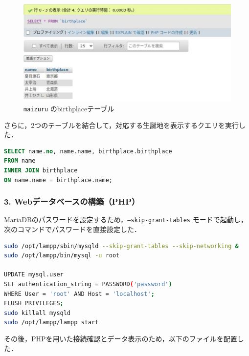 \begin{figure}[htbp]
  \centering
  \includegraphics[width=0.9\linewidth]{figure/4.pdf}
  \caption{\texttt{maizuru} のbirthplaceテーブル}
\end{figure}

さらに，2つのテーブルを結合して，対応する生誕地を表示するクエリを実行した．

\begin{lstlisting}[language=SQL]
SELECT name.no, name.name, birthplace.birthplace 
FROM name 
INNER JOIN birthplace 
ON name.name = birthplace.name;
\end{lstlisting}

\subsubsection*{3. Webデータベースの構築（PHP）}

MariaDBのパスワードを設定するため，\texttt{--skip-grant-tables} モードで起動し，次のコマンドでパスワードを直接設定した．

\begin{lstlisting}[language=bash]
sudo /opt/lampp/sbin/mysqld --skip-grant-tables --skip-networking &
sudo /opt/lampp/bin/mysql -u root

UPDATE mysql.user 
SET authentication_string = PASSWORD('password') 
WHERE User = 'root' AND Host = 'localhost';
FLUSH PRIVILEGES;
sudo killall mysqld
sudo /opt/lampp/lampp start
\end{lstlisting}

その後，PHPを用いた接続確認とデータ表示のため，以下のファイルを配置した．


